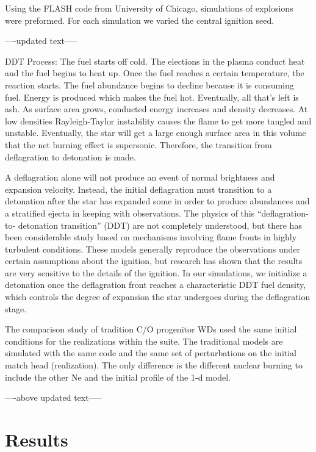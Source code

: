 \documentclass[iop,apj]{emulateapj}
\begin{document}
Using the FLASH code from University of Chicago, simulations of
explosions were preformed. For each simulation we varied the central
ignition seed. 

----updated text-----

DDT Process:
The fuel starts off cold. The elections in the plasma conduct heat
and the fuel begins to heat up. Once the fuel reaches a certain
temperature, the reaction starts. The fuel abundance begins to
decline because it is consuming fuel. Energy is produced which
makes the fuel hot. Eventually, all that’s left is ash. As
surface area grows, conducted energy increases and density
decreases. At low densities Rayleigh-Taylor instability causes
the flame to get more tangled and unstable. Eventually, the
star will get a large enough surface area in this volume that
the net burning effect is supersonic. Therefore, the transition
from deflagration to detonation is made.

A deflagration alone will not produce an event of normal
brightness and expansion velocity. Instead, the initial
deflagration must transition to a detonation after the star has
expanded some in order to produce abundances and a stratified
ejecta in keeping with observations. The physics of this
“deflagration-to- detonation transition” (DDT) are not
completely understood, but there has been considerable study
based on mechanisms involving flame fronts in highly turbulent
conditions. These models generally reproduce the observations
under certain assumptions about the ignition, but research has
shown that the results are very sensitive to the details of the
ignition. In our simulations, we initialize a detonation once
the deflagration front reaches a characteristic DDT fuel density,
which controls the degree of expansion the star undergoes during
the deflagration stage.

The comparison study of tradition C/O progenitor WDs used the same initial
conditions for the realizations within the suite. The traditional models
are simulated with the same code and the same set of perturbations on the
initial match head (realization). The only difference is the different
nuclear burning to include the other Ne and the initial profile of the
1-d model.

----above updated text-----



\section{Results}
\end{document}
